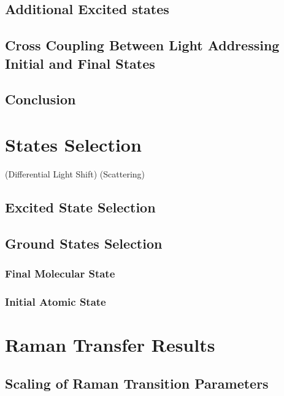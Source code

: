 \subsection{Additional Excited states}

\subsection{Cross Coupling Between Light Addressing Initial and Final States}

\subsection{Conclusion}


\section{States Selection}
\label{ch:raman-transfer:state-selction}

(Differential Light Shift)
(Scattering)

\subsection{Excited State Selection}

\subsection{Ground States Selection}

\subsubsection{Final Molecular State}

\subsubsection{Initial Atomic State}

\section{Raman Transfer Results}

\subsection{Scaling of Raman Transition Parameters}
